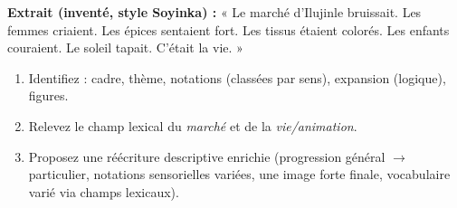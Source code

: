 \documentclass[11pt]{article}
\begin{document}
\begin{exercice}
\textbf{Extrait (inventé, style Soyinka) :} « Le marché d'Ilujinle bruissait. Les femmes criaient. Les épices sentaient fort. Les tissus étaient colorés. Les enfants couraient. Le soleil tapait. C'était la vie. »
\begin{enumerate}
    \item Identifiez : cadre, thème, notations (classées par sens), expansion (logique), figures.
    \item Relevez le champ lexical du \emph{marché} et de la \emph{vie/animation}.
    \item Proposez une réécriture descriptive enrichie (progression général $\rightarrow$ particulier, notations sensorielles variées, une image forte finale, vocabulaire varié via champs lexicaux).
\end{enumerate}
\end{exercice}
\end{document}
